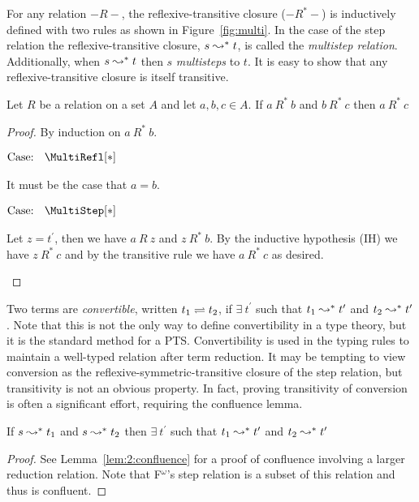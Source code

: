 

For any relation $-R-$, the reflexive-transitive closure ($-R^*-$) is inductively defined with two rules as shown in Figure~\ref{fig:multi}.
In the case of the step relation the reflexive-transitive closure, $s \leadsto^* t$, is called the \textit{multistep relation}.
Additionally, when $s \leadsto^* t$ then $s$ \textit{multisteps} to $t$.
It is easy to show that any reflexive-transitive closure is itself transitive.

\begin{lemma}
    Let $R$ be a relation on a set $A$ and let $a, b, c \in A$. If $a\ R^*\ b$ and $b\ R^*\ c$ then $a\ R^*\ c$
\end{lemma}
\begin{proof}
    By induction on $a\ R^*\ b$.

    $\text{Case: }\begin{array}{c} \MultiRefl[*] \end{array}$
    \begin{proofcase}
        It must be the case that $a = b$.
    \end{proofcase}

    $\text{Case: }\begin{array}{c} \MultiStep[*] \end{array}$
    \begin{proofcase}
        Let $z = t^\prime$, then we have $a\ R\ z$ and $z\ R^*\ b$.
        By the inductive hypothesis (IH) we have $z\ R^*\ c$ and by the transitive rule we have $a\ R^*\ c$ as desired.
    \end{proofcase}
\end{proof}

Two terms are \textit{convertible}, written $t_1 \rightleftharpoons t_2$, if $\exists\ t^\prime$ such that $t_1 \leadsto^* t^\prime$ and $t_2 \leadsto^* t^\prime$.
Note that this is not the only way to define convertibility in a type theory, but it is the standard method for a PTS.
Convertibility is used in the typing rules to maintain a well-typed relation after term reduction.
It may be tempting to view conversion as the reflexive-symmetric-transitive closure of the step relation, but transitivity is not an obvious property.
In fact, proving transitivity of conversion is often a significant effort, requiring the confluence lemma.

\begin{lemma}[Confluence]
    If $s \leadsto^* t_1$ and $s \leadsto^* t_2$ then $\exists\ t^\prime$ such that $t_1 \leadsto^* t^\prime$ and $t_2 \leadsto^* t^\prime$
\end{lemma}
\begin{proof}
    See Lemma~\ref{lem:2:confluence} for a proof of confluence involving a larger reduction relation.
    Note that F$^\omega$'s step relation is a subset of this relation and thus is confluent.
\end{proof}

